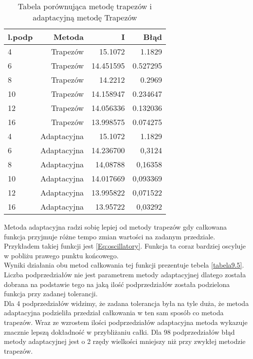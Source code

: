 \documentclass[12pt,twoside]{article}
\begin{document}
\begin{table}[h]
\centering 
\caption{Tabela porównująca metodę trapezów i adaptacyjną metodę Trapezów}
\label{tabela9.4}
\begin{tabular}{lrrr}
\toprule
{l.podp} & Metoda &  I &  Błąd \\
\midrule
4  &     Trapezów & 15.1072  &   1.1829 \\
6  &     Trapezów & 14.451595 &   0.527295 \\
8  &     Trapezów & 14.2212   &   0.2969  \\
10  &    Trapezów & 14.158947  &   0.234647  \\
12  &    Trapezów & 14.056336 &    0.132036  \\
16 &     Trapezów & 13.998575  &   0.074275  \\
\midrule
4  &     Adaptacyjna & 15.1072 &   1.1829 \\
6  &     Adaptacyjna & 14.236700 &   0,3124 \\
8  &     Adaptacyjna & 14,08788  &   0,16358  \\
10  &     Adaptacyjna & 14.017669 &  0,093369  \\
12  &    Adaptacyjna & 13.995822 &   0,071522  \\
16 &     Adaptacyjna & 13.95722 &    0,03292  \\

\bottomrule
\end{tabular}
\end{table}

Metoda adaptacyjna radzi sobię lepiej od metody trapezów gdy całkowana funkcja przyjmuje różne tempo zmian wartości na zadanym przedziale. Przykładem takiej funkcji jest \eqref{Eq:oscillatory}. Funkcja ta coraz bardziej oscyluje w pobliżu prawego punktu końcowego.\\
Wyniki działania obu metod całkowania tej funkcji prezentuje tebela \eqref{tabela9.5}.\\
Liczba podprzedziałów nie jest parametrem metody adaptacyjnej dlatego została dobrana na podstawie tego na jaką ilość podprzedziałów została podzielona funkcja przy zadanej tolerancji.\\
Dla 4 podprzedziałów widzimy, że zadana tolerancja była na tyle duża, że metoda adaptacyjna podzieliła przedział całkowania w ten sam sposób co metoda trapezów.
Wraz ze wzrostem ilości podprzedziałów adaptacyjna metoda wykazuje znacznie lepszą dokładność w przybliżaniu całki. Dla 98 podprzedziałów błąd metody adaptacyjnej jest o 2 rzędy wielkości mniejszy niż przy zwykłej metodzie trapezów.
\end{document}
